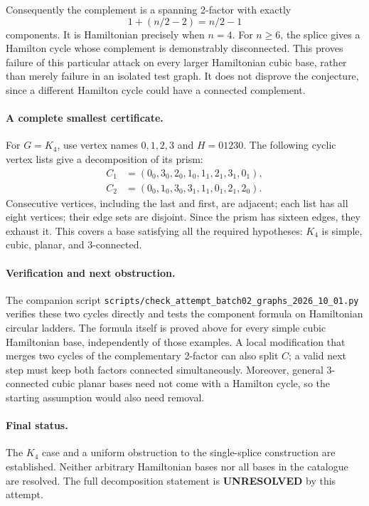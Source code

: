 \documentclass[11pt,a4paper]{article}
\begin{document}
Consequently the complement is a spanning 2-factor with exactly
\[
 1+(n/2-2)=n/2-1
\]
components. It is Hamiltonian precisely when $n=4$. For $n\ge6$, the splice gives a Hamilton cycle whose complement is demonstrably disconnected. This proves failure of this particular attack on every larger Hamiltonian cubic base, rather than merely failure in an isolated test graph. It does not disprove the conjecture, since a different Hamilton cycle could have a connected complement.

\paragraph{A complete smallest certificate.}
For $G=K_4$, use vertex names $0,1,2,3$ and $H=01230$. The following cyclic vertex lists give a decomposition of its prism:
\[
\begin{split}
 C_1&=(0_0,3_0,2_0,1_0,1_1,2_1,3_1,0_1),\\
 C_2&=(0_0,1_0,3_0,3_1,1_1,0_1,2_1,2_0).
\end{split}
\]
Consecutive vertices, including the last and first, are adjacent; each list has all eight vertices; their edge sets are disjoint. Since the prism has sixteen edges, they exhaust it. This covers a base satisfying all the required hypotheses: $K_4$ is simple, cubic, planar, and 3-connected.

\paragraph{Verification and next obstruction.}
The companion script \texttt{scripts/check\_attempt\_batch02\_graphs\_2026\_10\_01.py} verifies these two cycles directly and tests the component formula on Hamiltonian circular ladders. The formula itself is proved above for every simple cubic Hamiltonian base, independently of those examples. A local modification that merges two cycles of the complementary 2-factor can also split $C$; a valid next step must keep both factors connected simultaneously. Moreover, general 3-connected cubic planar bases need not come with a Hamilton cycle, so the starting assumption would also need removal.

\paragraph{Final status.}
The $K_4$ case and a uniform obstruction to the single-splice construction are established. Neither arbitrary Hamiltonian bases nor all bases in the catalogue are resolved. The full decomposition statement is \textbf{UNRESOLVED} by this attempt.
\end{document}
